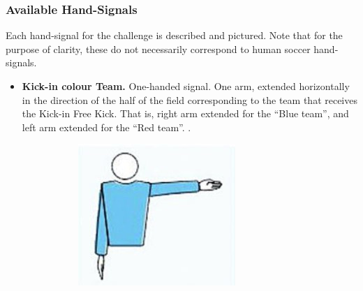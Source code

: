     \subsubsection{Available Hand-Signals}

        Each hand-signal for the challenge is described and pictured. Note that for the purpose of clarity, these do not necessarily correspond to human soccer hand-signals.

        \begin{itemize}
            \item \textbf{Kick-in \textlangle{}colour\textrangle{} Team.}
            One-handed signal. One arm, extended horizontally in the direction of the half of the field corresponding to the team that receives the Kick-in Free Kick. That is, right arm extended for the ``Blue team'', and left arm extended for the ``Red team''.
            .
            \begin{figure}[ht!]
                \centering
                \begin{subfigure}{.33\textwidth}
                  \includegraphics{figs/kick-off_referee.jpg}
                \end{subfigure}%
            \end{figure}
            

\end{itemize}
